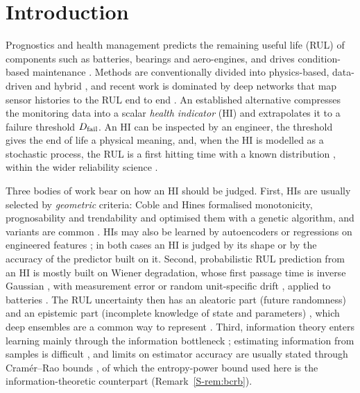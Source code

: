 \documentclass[preprint,12pt]{elsarticle}
\theoremstyle{definition}
\begin{document}
\section{Introduction}
Prognostics and health management predicts the remaining useful life (RUL) of components such as batteries, bearings and aero-engines, and drives condition-based maintenance \cite{si2011,lei2018,javed2017,zio2022}. Methods are conventionally divided into physics-based, data-driven and hybrid \cite{javed2017}, and recent work is dominated by deep networks that map sensor histories to the RUL end to end \cite{li2018}. An established alternative compresses the monitoring data into a scalar \emph{health indicator} (HI) and extrapolates it to a failure threshold $D_{\rm fail}$. An HI can be inspected by an engineer, the threshold gives the end of life a physical meaning, and, when the HI is modelled as a stochastic process, the RUL is a first hitting time with a known distribution \cite{whitmore1995,lee2006,si2011}, within the wider reliability science \cite{aven2021}.

Three bodies of work bear on how an HI should be judged. First, HIs are usually selected by \emph{geometric} criteria: Coble and Hines \cite{coble2009} formalised monotonicity, prognosability and trendability and optimised them with a genetic algorithm, and variants are common \cite{javed2013,zhang2016}. HIs may also be learned by autoencoders \cite{kingma2014} or regressions on engineered features \cite{severson2019}; in both cases an HI is judged by its shape or by the accuracy of the predictor built on it. Second, probabilistic RUL prediction from an HI is mostly built on Wiener degradation, whose first passage time is inverse Gaussian \cite{folks1978,chhikara1989,tweedie1957}, with measurement error \cite{whitmore1995,tang2014} or random unit-specific drift \cite{gebraeel2005,wang2010}, applied to batteries \cite{tang2014}. The RUL uncertainty then has an aleatoric part (future randomness) and an epistemic part (incomplete knowledge of state and parameters) \cite{sankararaman2013}, which deep ensembles are a common way to represent \cite{lakshminarayanan2017}. Third, information theory \cite{cover2006} enters learning mainly through the information bottleneck \cite{tishby2000,alemi2017}; estimating information from samples is difficult \cite{kraskov2004,paninski2003}, and limits on estimator accuracy are usually stated through Cram\'er--Rao bounds \cite{vantrees1968,gill1995}, of which the entropy-power bound used here is the information-theoretic counterpart \cite{cover2006} (Remark~\ref{S-rem:bcrb}).
\end{document}
